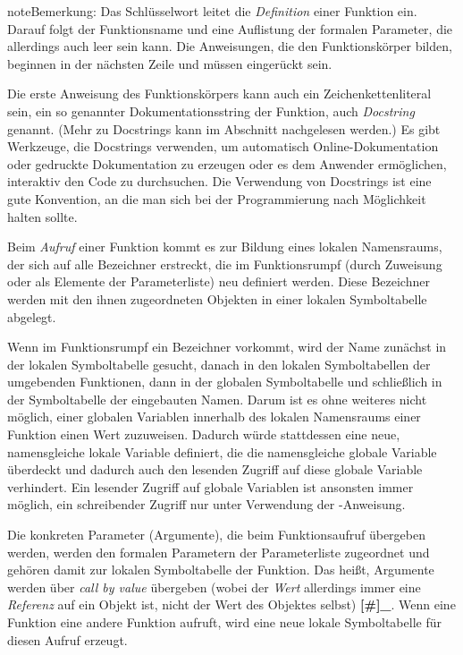 \documentclass[letterpaper,10pt,ngerman]{sphinxmanual}
\begin{document}
\begin{notice}{note}{Bemerkung:}
Das Schlüsselwort \href{https://docs.python.org/reference/compound\_stmts.html\#def}{} leitet die \emph{Definition} einer Funktion ein.
Darauf folgt der Funktionsname und eine Auflistung der formalen Parameter, die
allerdings auch leer sein kann. Die Anweisungen, die den Funktionskörper bilden,
beginnen in der nächsten Zeile und müssen eingerückt sein.

Die erste Anweisung des Funktionskörpers kann auch ein Zeichenkettenliteral
sein, ein so genannter Dokumentationsstring der Funktion, auch \emph{Docstring}
genannt. (Mehr zu Docstrings kann im Abschnitt \href{https://docs.python.org/tutorial/controlflow.html\#tut-docstrings}{}
nachgelesen werden.) Es gibt Werkzeuge, die Docstrings verwenden, um automatisch
Online-Dokumentation oder gedruckte Dokumentation zu erzeugen oder es dem
Anwender ermöglichen, interaktiv den Code zu durchsuchen. Die Verwendung von
Docstrings ist eine gute Konvention, an die man sich bei der Programmierung nach
Möglichkeit halten sollte.

Beim \emph{Aufruf} einer Funktion kommt es zur Bildung eines lokalen Namensraums, der
sich auf alle Bezeichner erstreckt, die im Funktionsrumpf (durch Zuweisung oder
als Elemente der Parameterliste) neu definiert werden. Diese Bezeichner werden
mit den ihnen zugeordneten Objekten in einer lokalen Symboltabelle abgelegt.

Wenn im Funktionsrumpf ein Bezeichner vorkommt, wird der Name zunächst in der
lokalen Symboltabelle gesucht, danach in den lokalen Symboltabellen der
umgebenden Funktionen, dann in der globalen Symboltabelle und schließlich in der
Symboltabelle der eingebauten Namen. Darum ist es ohne weiteres nicht möglich,
einer globalen Variablen innerhalb des lokalen Namensraums einer Funktion einen
Wert zuzuweisen.  Dadurch würde stattdessen eine neue, namensgleiche lokale
Variable definiert, die die namensgleiche globale Variable überdeckt und dadurch
auch den lesenden Zugriff auf diese globale Variable verhindert. Ein lesender
Zugriff auf globale Variablen ist ansonsten immer möglich, ein schreibender
Zugriff nur unter Verwendung der \href{https://docs.python.org/reference/simple\_stmts.html\#global}{}-Anweisung.

Die konkreten Parameter (Argumente), die beim Funktionsaufruf übergeben werden,
werden den formalen Parametern der Parameterliste zugeordnet und gehören damit
zur lokalen Symboltabelle der Funktion. Das heißt, Argumente werden über \emph{call
by value} übergeben (wobei der \emph{Wert} allerdings immer eine \emph{Referenz} auf ein
Objekt ist, nicht der Wert des Objektes selbst) {\color{red}\bfseries{}{[}\#{]}\_}. Wenn eine Funktion eine
andere Funktion aufruft, wird eine neue lokale Symboltabelle für diesen Aufruf
erzeugt.


\end{notice}
\end{document}
